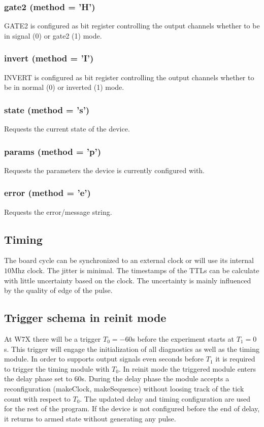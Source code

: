 \documentclass{article}
\begin{document}
\subsubsection*{gate2 (method = 'H')}
GATE2 is configured as bit register controlling the output channels whether to be in signal (0) or gate2 (1) mode.
\subsubsection*{invert (method = 'I')}
INVERT is configured as bit register controlling the output channels whether to be in normal (0) or inverted (1) mode.
\subsubsection*{state (method = 's')}
Requests the current state of the device.
\subsubsection*{params (method = 'p')}
Requests the parameters the device is  currently configured with.
\subsubsection*{error (method = 'e')}
Requests the error/message string. 

\subsection*{Timing}
The board cycle can be synchronized to an external clock or will use its internal $10$Mhz clock.
The jitter is minimal. The timestamps of the TTLs can be calculate with little uncertainty based on the clock. The uncertainty is mainly influenced by the quality of edge of the pulse.

\subsection*{Trigger schema in reinit mode}
At W7X there will be a trigger $T_0=-60$s before the experiment starts at $T_1=0$s. This trigger will engage the initialization of all diagnostics as well as the timing module. In order to supports output signals even seconds before $T_1$ it is required to trigger the timing module with $T_0$. In reinit mode the triggered module enters the delay phase set to $60$s. During the delay phase the module accepts a reconfiguration (makeClock, makeSequence) without loosing track of the tick count with respect to $T_0$. The updated delay and timing configuration are used for the rest of the program. If the device is not configured before the end of delay, it returns to armed state without generating any pulse.
\end{document}
